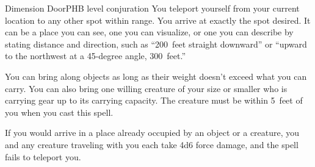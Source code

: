 \begin{spell}{Dimension Door}{PHB}{ level conjuration}
{
}
You teleport yourself from your current location to any
other spot within range. You arrive at exactly the spot
desired. It can be a place you can see, one you can
visualize, or one you can describe by stating distance
and direction, such as “200~feet straight downward” or
“upward to the northwest at a 45-degree angle, 300~feet.”

You can bring along objects as long as their weight
doesn't exceed what you can carry. You can also bring
one willing creature of your size or smaller who is
carrying gear up to its carrying capacity. The creature
must be within 5~feet of you when you cast this spell.

If you would arrive in a place already occupied by an
object or a creature, you and any creature traveling with
you each take 4d6 force damage, and the spell fails to
teleport you.
\end{spell}